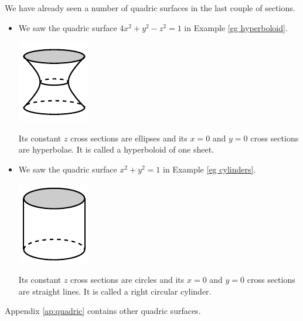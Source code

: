 We have already seen a number of quadric surfaces in the last couple of 
sections.
\begin{itemize}
\item
We saw the quadric surface $4x^2+y^2-z^2=1$ in Example \ref{eg hyperboloid}. 
\begin{efig}
\begin{center}
   \includegraphics[scale=1.1]{figures/quadric/hyperboloid1.pdf}\qquad
\end{center}
\end{efig}
Its constant $z$ cross sections are ellipses and its $x=0$ and $y=0$
cross sections are hyperbolae. It is called a hyperboloid of one sheet.


\item 
We saw the quadric surface $x^2+y^2=1$ in Example \ref{eg cylinders}.
\begin{efig}
\begin{center}
   \includegraphics[scale=1.1]{figures/quadric/cylinder.pdf}\qquad
\end{center}
\end{efig}
Its constant $z$ cross sections are circles and its $x=0$ and $y=0$
cross sections are straight lines. It is called a right circular cylinder.



\end{itemize}

Appendix \ref{ap:quadric} contains other quadric surfaces.




